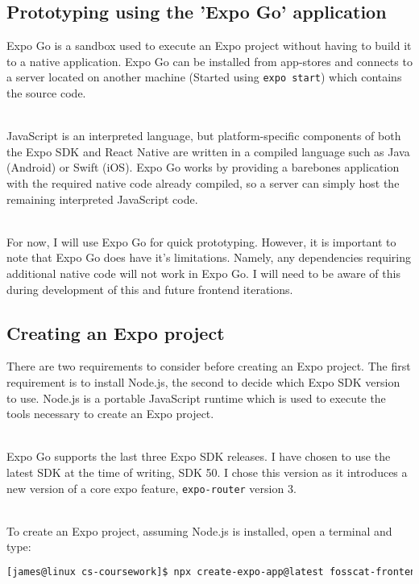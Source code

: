 \documentclass[../../main.tex]{subfiles}
\begin{document}
\subsection{Prototyping using the 'Expo Go' application}

Expo Go is a sandbox used to execute an Expo project without having to build it to a native application.
Expo Go can be installed from app-stores and connects to a server located
on another machine (Started using \lstinline{expo start}) which contains the source code.

\noindent \\ JavaScript is an interpreted language, but platform-specific components of both
the Expo SDK and React Native are written in a compiled language such as Java (Android) or Swift (iOS).
Expo Go works by providing a barebones application with the required native code already compiled,
so a server can simply host the remaining interpreted JavaScript code.

\noindent \\ For now, I will use Expo Go for quick prototyping.
However, it is important to note that Expo Go does have it's limitations.
Namely, any dependencies requiring additional native code will not work in Expo Go.
I will need to be aware of this during development of this and future frontend iterations.

\subsection{Creating an Expo project}

There are two requirements to consider before creating an Expo project.
The first requirement is to install Node.js, the second to decide which Expo SDK version
to use. Node.js is a portable JavaScript runtime which is used to execute the tools necessary
to create an Expo project.

\noindent \\ Expo Go supports the last three Expo SDK releases.
I have chosen to use the latest SDK at the time of writing, SDK 50.
I chose this version as it introduces a new version of a core expo feature,
\lstinline{expo-router} version 3.

\noindent \\ To create an Expo project, assuming Node.js is installed, open a terminal and type:

\begin{lstlisting}[language=bash]
    [james@linux cs-coursework]$ npx create-expo-app@latest fosscat-frontend --template tabs@50
\end{lstlisting}
\end{document}
